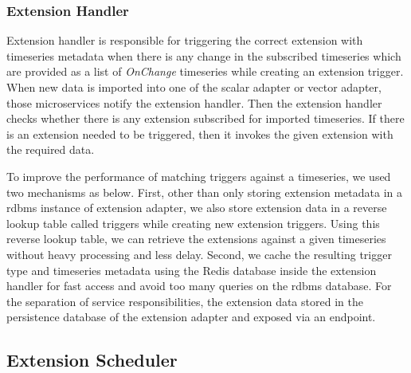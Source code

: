 \subsubsection{Extension Handler}

Extension handler is responsible for triggering the correct extension with timeseries metadata when there is any change in the subscribed timeseries which are provided as a list of \emph{OnChange} timeseries while creating an extension trigger.
When new data is imported into one of the scalar adapter or vector adapter, those microservices notify the extension handler. Then the extension handler checks whether there is any extension subscribed for imported timeseries. If there is an extension needed to be triggered, then it invokes the given extension with the required data.

To improve the performance of matching triggers against a timeseries, we used two mechanisms as below. First, other than only storing extension metadata in a \acrshort{rdbms} instance of extension adapter, we also store extension data in a reverse lookup table called triggers while creating new extension triggers. Using this reverse lookup table, we can retrieve the extensions against a given timeseries without heavy processing and less delay. Second, we cache the resulting trigger type and timeseries metadata using the Redis database inside the extension handler for fast access and avoid too many queries on the \acrshort{rdbms} database. For the separation of service responsibilities, the extension data stored in the persistence database of the extension adapter and exposed via an endpoint.

\subsection{Extension Scheduler}

